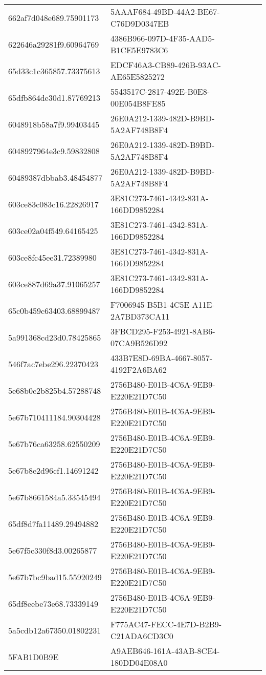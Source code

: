 \begin{tabular}{ll}
662af7d048e689.75901173 & 5AAAF684-49BD-44A2-BE67-C76D9D0347EB \\
622646a29281f9.60964769 & 4386B966-097D-4F35-AAD5-B1CE5E9783C6 \\
65d33c1c365857.73375613 & EDCF46A3-CB89-426B-93AC-AE65E5825272 \\
65dfb864de30d1.87769213 & 5543517C-2817-492E-B0E8-00E054B8FE85 \\
6048918b58a7f9.99403445 & 26E0A212-1339-482D-B9BD-5A2AF748B8F4 \\
6048927964e3c9.59832808 & 26E0A212-1339-482D-B9BD-5A2AF748B8F4 \\
60489387dbbab3.48454877 & 26E0A212-1339-482D-B9BD-5A2AF748B8F4 \\
603ce83c083c16.22826917 & 3E81C273-7461-4342-831A-166DD9852284 \\
603ce02a04f549.64165425 & 3E81C273-7461-4342-831A-166DD9852284 \\
603ce8fc45ee31.72389980 & 3E81C273-7461-4342-831A-166DD9852284 \\
603ce887d69a37.91065257 & 3E81C273-7461-4342-831A-166DD9852284 \\
65c0b459c63403.68899487 & F7006945-B5B1-4C5E-A11E-2A7BD373CA11 \\
5a991368cd23d0.78425865 & 3FBCD295-F253-4921-8AB6-07CA9B526D92 \\
546f7ac7ebe296.22370423 & 433B7E8D-69BA-4667-8057-4192F2A6BA62 \\
5e68b0c2b825b4.57288748 & 2756B480-E01B-4C6A-9EB9-E220E21D7C50 \\
5e67b710411184.90304428 & 2756B480-E01B-4C6A-9EB9-E220E21D7C50 \\
5e67b76ca63258.62550209 & 2756B480-E01B-4C6A-9EB9-E220E21D7C50 \\
5e67b8e2d96cf1.14691242 & 2756B480-E01B-4C6A-9EB9-E220E21D7C50 \\
5e67b8661584a5.33545494 & 2756B480-E01B-4C6A-9EB9-E220E21D7C50 \\
65df8d7fa11489.29494882 & 2756B480-E01B-4C6A-9EB9-E220E21D7C50 \\
5e67f5c330f8d3.00265877 & 2756B480-E01B-4C6A-9EB9-E220E21D7C50 \\
5e67b7bc9bad15.55920249 & 2756B480-E01B-4C6A-9EB9-E220E21D7C50 \\
65df8eebe73e68.73339149 & 2756B480-E01B-4C6A-9EB9-E220E21D7C50 \\
5a5cdb12a67350.01802231 & F775AC47-FECC-4E7D-B2B9-C21ADA6CD3C0 \\
5FAB1D0B9E & A9AEB646-161A-43AB-8CE4-180DD04E08A0 \\

\end{tabular}

